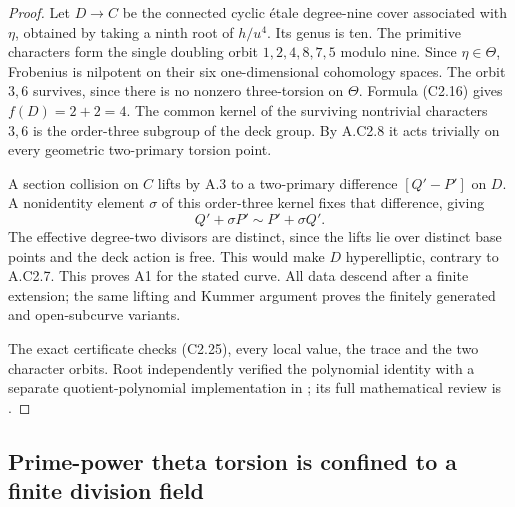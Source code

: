 \begin{proof}
Let $D\to C$ be the connected cyclic \'etale degree-nine cover
associated with $\eta$, obtained by taking a ninth root of $h/u^4$.
Its genus is ten. The primitive characters form the single doubling
orbit $1,2,4,8,7,5$ modulo nine. Since $\eta\in\Theta$, Frobenius
is nilpotent on their six one-dimensional cohomology spaces.
The orbit $3,6$ survives, since there is no nonzero three-torsion
on $\Theta$. Formula (C2.16) gives $f(D)=2+2=4$.
The common kernel of the surviving nontrivial characters $3,6$
is the order-three subgroup of the deck group. By A.C2.8 it
acts trivially on every geometric two-primary torsion point.

A section collision on $C$ lifts by A.3 to a two-primary difference
$[Q'-P']$ on $D$. A nonidentity element $\sigma$ of this
order-three kernel fixes that difference, giving
\[
                     Q'+\sigma P'\sim P'+\sigma Q'.
\]
The effective degree-two divisors are distinct, since the lifts
lie over distinct base points and the deck action is free. This
would make $D$ hyperelliptic, contrary to A.C2.7. This proves A1 for
the stated curve.
All data descend after a finite extension; the same lifting and
Kummer argument proves the finitely generated and open-subcurve
variants.

The exact certificate 
checks (C2.25), every local value, the trace and the two character
orbits. Root independently verified the polynomial identity with a
separate quotient-polynomial implementation in
; its full mathematical
review is .
\end{proof}

\subsection{Prime-power theta torsion is confined to a finite division field}

